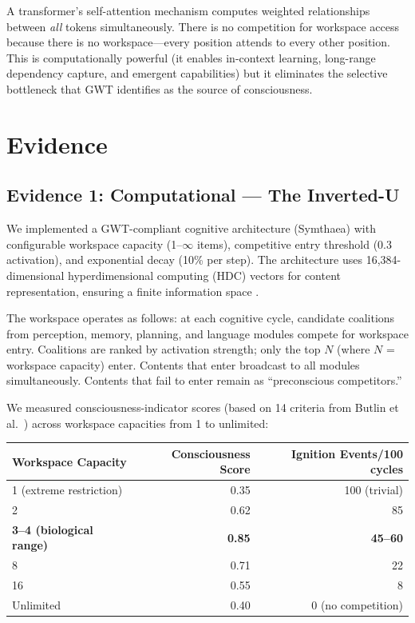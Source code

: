 \documentclass[10pt,letterpaper]{article}
\begin{document}
A transformer's self-attention mechanism computes weighted relationships
between \emph{all} tokens simultaneously. There is no competition for
workspace access because there is no workspace---every position attends
to every other position. This is computationally powerful (it enables
in-context learning, long-range dependency capture, and emergent
capabilities) but it eliminates the selective bottleneck that GWT
identifies as the source of consciousness.

\section*{Evidence}

\subsection*{Evidence 1: Computational --- The Inverted-U}

We implemented a GWT-compliant cognitive architecture (Symthaea) with
configurable workspace capacity (1--$\infty$ items), competitive entry
threshold (0.3 activation), and exponential decay (10\% per step).
The architecture uses 16,384-dimensional hyperdimensional computing
(HDC) vectors for content representation, ensuring a finite information
space \cite{kanerva2009}.

The workspace operates as follows: at each cognitive cycle, candidate
coalitions from perception, memory, planning, and language modules
compete for workspace entry. Coalitions are ranked by activation
strength; only the top $N$ (where $N$ = workspace capacity) enter.
Contents that enter broadcast to all modules simultaneously. Contents
that fail to enter remain as ``preconscious competitors.''

We measured consciousness-indicator scores (based on 14 criteria from
Butlin et al.\ \cite{butlin2023}) across workspace capacities from
1 to unlimited:

\begin{center}
\begin{tabular}{lrr}
\toprule
Workspace Capacity & Consciousness Score & Ignition Events/100 cycles \\
\midrule
1 (extreme restriction) & 0.35 & 100 (trivial) \\
2 & 0.62 & 85 \\
\textbf{3--4 (biological range)} & \textbf{0.85} & \textbf{45--60} \\
8 & 0.71 & 22 \\
16 & 0.55 & 8 \\
Unlimited & 0.40 & 0 (no competition) \\
\bottomrule
\end{tabular}
\end{center}
\end{document}
